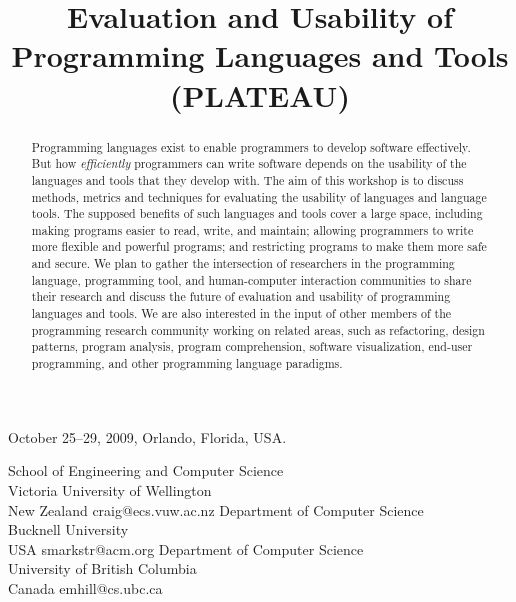\documentclass[9pt]{sigplanconf}
\begin{document}
\authorpermission
{} {October 25--29, 2009, Orlando, Florida, USA.}



\title{Evaluation and Usability of Programming Languages and Tools (PLATEAU)}

           {School of Engineering and Computer Science\\Victoria University of Wellington\\New Zealand}
           {craig@ecs.vuw.ac.nz}
           {Department of Computer Science\\Bucknell University\\USA}
           {smarkstr@acm.org}
           {Department of Computer Science\\University of British Columbia\\Canada}
           {emhill@cs.ubc.ca}
\maketitle

\begin{abstract}
  Programming languages exist to enable programmers to develop
  software effectively.  But how \emph{efficiently} programmers can
  write software depends on the usability of the languages and tools
  that they develop with.  The aim of this workshop is to discuss
  methods, metrics and techniques for evaluating the usability of
  languages and language tools.  The supposed benefits of such
  languages and tools cover a large space, including making programs
  easier to read, write, and maintain; allowing programmers to write
  more flexible and powerful programs; and restricting programs to
  make them more safe and secure. We plan to gather the intersection
  of researchers in the programming language, programming tool, and
  human-computer interaction communities to share their research and
  discuss the future of evaluation and usability of programming
  languages and tools. We are also interested in the input of other
  members of the programming research community working on related
  areas, such as refactoring, design patterns, program analysis,
  program comprehension, software visualization, end-user programming,
  and other programming language paradigms.
\end{abstract}
\end{document}
